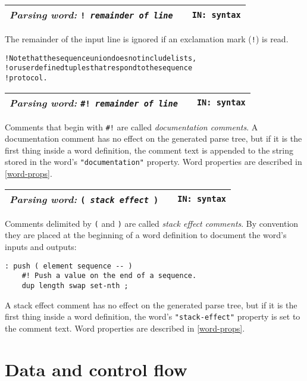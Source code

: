 \documentclass{report}
\newcommand{\parsingword}[3]{\index{#1}
\emph{Parsing word:} \texttt{#2} &&\texttt{IN: #3}}
\newcommand{\wordtable}[1]{

\begin{tabularx}{12cm}[t]{lXr}
\hline
#1\\
\hline
\end{tabularx}

}
\begin{document}
\wordtable{
\parsingword{!}{!~\emph{remainder of line}}{syntax}
}
The remainder of the input line is ignored if an exclamation mark (\texttt{!}) is read.
\begin{alltt}
! Note that the sequence union does not include lists,
! or user defined tuples that respond to the sequence
! protocol.
\end{alltt}
\wordtable{
\parsingword{hash!}{\#!~\emph{remainder of line}}{syntax}
}
\newcommand{\doccommentglos}{}
\doccommentglos
Comments that begin with \texttt{\#!} are called \emph{documentation comments}.
A documentation comment has no effect on the generated parse tree, but if it is the first thing inside a word definition, the comment text is appended to the string stored in the word's \texttt{"documentation"} property. Word properties are described in \ref{word-props}.
\wordtable{
\parsingword{(}{( \emph{stack effect} )}{syntax}
}
\newcommand{\stackcommentglos}{}
\stackcommentglos
Comments delimited by \texttt{(} and \texttt{)} are called \emph{stack effect comments}. By convention they are placed at the beginning of a word definition to document the word's inputs and outputs:
\begin{verbatim}
: push ( element sequence -- )
    #! Push a value on the end of a sequence.
    dup length swap set-nth ;
\end{verbatim}
A stack effect comment has no effect on the generated parse tree, but if it is the first thing inside a word definition, the word's \texttt{"stack-effect"} property is set to the comment text. Word properties are described in \ref{word-props}.

\section{Data and control flow}
\end{document}
